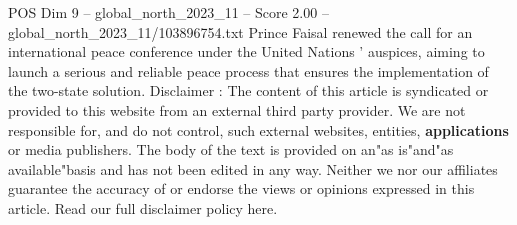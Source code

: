 \begin{textsample}{POS Dim 9 – global\_north\_2023\_11 – Score 2.00 – global\_north\_2023\_11/103896754.txt}
Prince Faisal renewed the call for an international peace conference under the United Nations ' auspices, aiming to launch a serious and reliable peace process that ensures the implementation of the two-state solution.
Disclaimer : The content of this article is syndicated or provided to this website from an external third party provider.
We are not responsible for, and do not control, such external websites, entities, \textbf{applications} or media publishers.
The body of the text is provided on an"as is"and"as available"basis and has not been edited in any way.
Neither we nor our affiliates guarantee the accuracy of or endorse the views or opinions expressed in this article.
Read our full disclaimer policy here.

\end{textsample}
